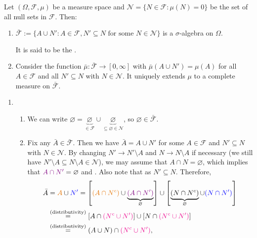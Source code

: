 \begin{enumerate}
\begin{theorem}
\label{thm:complete-meas}
Let \((\Omega,\mathcal{F},\mu)\) be a measure space and
\(\mathcal{N}=\{N\in\mathcal{F}:\mu(N)=0\}\) be the set of all null sets in
\(\mathcal{F}\). Then:
\begin{enumerate}
\item \(\bar{\mathcal{F}}:=\{A\cup N':A\in\mathcal{F}, N'\subseteq
N\text{ for some }N\in\mathcal{N}\}\) is a \(\sigma\)-algebra on \(\Omega\).
\begin{note}
It is said to be the .
\end{note}
\item Consider the function
\(\bar{\mu}:\bar{\mathcal{F}}\to[0,\infty]\) with
\(\bar{\mu}(A\cup N')=\mu(A)\) for all \(A\in\mathcal{F}\) and all
\(N'\subseteq N\) with \(N\in\mathcal{N}\). It uniquely extends \(\mu\) to a
complete measure on \(\bar{\mathcal{F}}\).
\end{enumerate}
\end{theorem}
\begin{pf}
\begin{enumerate}
\item \begin{enumerate}[label={(\arabic*)}]
\item We can write
\(\varnothing=\underbrace{\varnothing}_{\in\mathcal{F}}\cup\underbrace{\varnothing}_{\subseteq \varnothing\in\mathcal{N}}\),
so \(\varnothing\in\bar{\mathcal{F}}\).
\item Fix any \(\bar{A}\in\bar{\mathcal{F}}\). Then we have
\(\bar{A}=A\cup N'\) for some \(A\in\mathcal{F}\) and \(N'\subseteq N\)
with \(N\in\mathcal{N}\). By changing \(N'\to N'\setminus A\) and \(N\to
N\setminus A\) if necessary (we still have \(N'\setminus A\subseteq N\setminus
A\in\mathcal{N}\)), we may assume that \(A\cap N=\varnothing\), which implies
that \(\vc{A\cap N'}=\varnothing\) and . Also note that
 as \(N'\subseteq N\). Therefore,
\begin{align*}
\bar{A}&=\orc{A}\cup \blc{N'}
=\left[\orc{(A\cap N^c)}\cup\underbrace{\vc{(A\cap N')}}_{\varnothing}\right]\cup
\left[\underbrace{(N\cap N^c)}_{\varnothing}\cup \blc{(N\cap N')}\right] \\
&\overset{\text{(distributivity)}}{=}
\left[A\cap \mgc{(N^c\cup N')}\right]\cup\left[N\cap \mgc{(N^c\cup N')}\right] \\
&\overset{\text{(distributivity)}}{=}
(A\cup N)\cap\mgc{(N^c\cup N')},
\end{align*}

\end{enumerate}
\end{enumerate}
\end{pf}
\end{enumerate}
